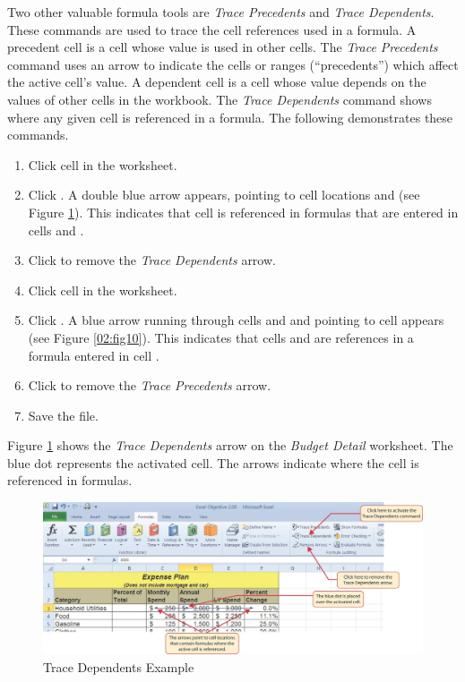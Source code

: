 Two other valuable formula tools are \textit{Trace Precedents} and \textit{Trace Dependents}. These commands are used to trace the cell references used in a formula. A precedent cell is a cell whose value is used in other cells. The \textit{Trace Precedents} command uses an arrow to indicate the cells or ranges (``precedents'') which affect the active cell's value. A dependent cell is a cell whose value depends on the values of other cells in the workbook. The \textit{Trace Dependents} command shows where any given cell is referenced in a formula. The following demonstrates these commands.

\begin{enumerate}
	\item Click cell  in the  worksheet.
	\item Click . A double blue arrow appears, pointing to cell locations  and  (see Figure \ref{02:fig09}). This indicates that cell  is referenced in formulas that are entered in cells  and .
	\item Click  to remove the \textit{Trace Dependents} arrow.
	\item Click cell  in the  worksheet.
	\item Click . A blue arrow running through cells  and  and pointing to cell  appears (see Figure \ref{02:fig10}). This indicates that cells  and  are references in a formula entered in cell .
	\item Click  to remove the \textit{Trace Precedents} arrow.
	\item Save the  file.
\end{enumerate}

Figure \ref{02:fig09} shows the \textit{Trace Dependents} arrow on the \textit{Budget Detail} worksheet. The blue dot represents the activated cell. The arrows indicate where the cell is referenced in formulas.

\begin{figure}[H]
	\centering
	\includegraphics[width=\maxwidth{.95\linewidth}]{gfx/ch02_fig09}
	\caption{Trace Dependents Example}
	\label{02:fig09}
\end{figure}

